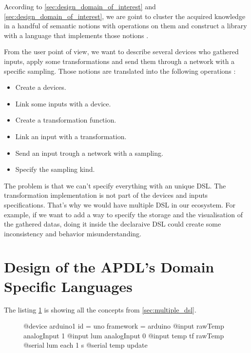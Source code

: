 According to \ref{sec:design_domain_of_interest} and
\ref{sec:design_domain_of_interest}, we are goint to cluster the acquired
knowledge in a handful of semantic notions with operations on them and construct
a library with a language that implements those notions
\cite{little_languages_little_maintenance}.

From the user point of view, we want to describe several devices who gathered
inputs, apply some transformations and send them through a network with a
specific sampling. Those notions are translated into the following operations :

\begin{itemize}
\item Create a devices.
\item Link some inputs with a device.
\item Create a transformation function.
\item Link an input with a transformation.
\item Send an input trough a network with a sampling.
\item Specify the sampling kind.
\end{itemize}

The problem is that we can't specify everything with an unique \gls{DSL}. The
transformation implementation is not part of the devices and inputs
specifications. That's why we would have multiple \gls{DSL} in our ecosystem.
For example, if we want to add a way to specify the storage and the
visualisation of the gathered datas, doing it inside the declaraive \gls{DSL}
could create some inconsistency and behavior misunderstanding.

\section{Design of the APDL's Domain Specific Languages}
\label{sec_design_apdl_dsls}

The listing \ref{lst:apdlcode_all} is showing all the concepts from
\ref{sec:multiple_dsl}.

\begin{figure}[ht]
  \centering
\begin{apdlcode}
@device arduino1 {
    id = uno
    framework = arduino
    @input rawTemp analogInput 1
    @input lum analogInput 0
    @input temp tf rawTemp
    @serial lum each 1 s
    @serial temp update
}
\end{apdlcode}
  \caption[]{}
  \label{lst:apdlcode_all}
\end{figure}

